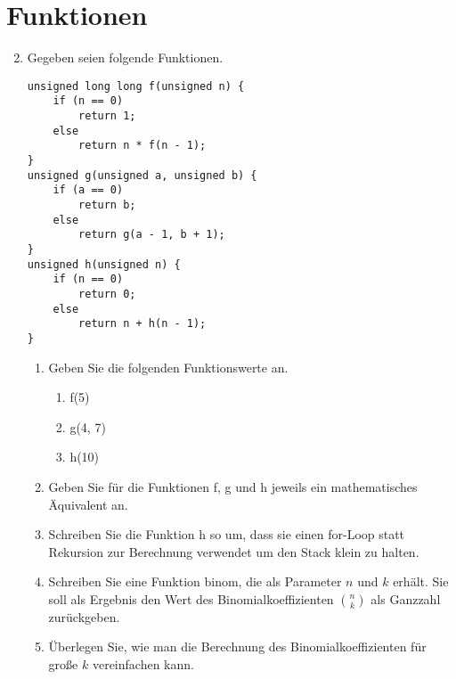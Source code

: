 \documentclass[ngerman]{tudscrreprt}
\begin{document}
\section*{Funktionen}
\begin{enumerate}
	\setcounter{enumi}{1}
	\item Gegeben seien folgende Funktionen.
	      \begin{lstlisting}[frame=single]
unsigned long long f(unsigned n) {
    if (n == 0)
        return 1;
    else
        return n * f(n - 1);
}
unsigned g(unsigned a, unsigned b) {
    if (a == 0)
        return b;
    else
        return g(a - 1, b + 1);
}
unsigned h(unsigned n) {
    if (n == 0)
        return 0;
    else
        return n + h(n - 1);
}
	\end{lstlisting}
	\begin{enumerate}
		\item Geben Sie die folgenden Funktionswerte an.
		      \begin{enumerate}[label=\roman*)]
		      	\item f(5)
		      	\item g(4, 7)
		      	\item h(10)
		      \end{enumerate}
		\item Geben Sie für die Funktionen f, g und h jeweils ein mathematisches Äquivalent an.
		\item Schreiben Sie die Funktion h so um, dass sie einen for-Loop statt Rekursion zur Berechnung verwendet um den Stack klein zu halten.
		\item Schreiben Sie eine Funktion binom, die als Parameter $n$ und $k$ erhält. Sie soll als Ergebnis den Wert des Binomialkoeffizienten $\binom{n}{k}$ als Ganzzahl zurückgeben.
		\item Überlegen Sie, wie man die Berechnung des Binomialkoeffizienten für große $k$ vereinfachen kann.
	\end{enumerate}
\end{enumerate}
\end{document}
